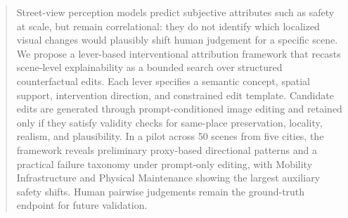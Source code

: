 \begin{abstract}
    Street-view perception models predict subjective attributes such as safety at scale, but remain correlational: they do not identify which localized visual changes would plausibly shift human judgement for a specific scene. We propose a lever-based interventional attribution framework that recasts scene-level explainability as a bounded search over structured counterfactual edits. Each lever specifies a semantic concept, spatial support, intervention direction, and constrained edit template. Candidate edits are generated through prompt-conditioned image editing and retained only if they satisfy validity checks for same-place preservation, locality, realism, and plausibility. In a pilot across 50 scenes from five cities, the framework reveals preliminary proxy-based directional patterns and a practical failure taxonomy under prompt-only editing, with Mobility Infrastructure and Physical Maintenance showing the largest auxiliary safety shifts. Human pairwise judgements remain the ground-truth endpoint for future validation.
\end{abstract}
